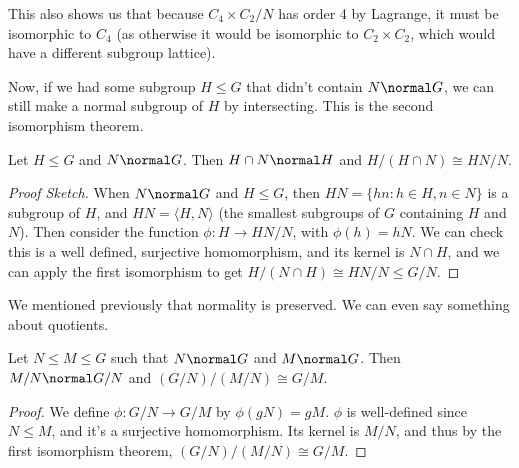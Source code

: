 \begin{example}
\begin{center}


	\end{center}
	This also shows us that because $C_4 \times C_2 / N$ has order 4 by Lagrange, it must be isomorphic to $C_4$ (as otherwise it would be isomorphic to $C_2 \times C_2$, which would have a different subgroup lattice).
\end{example}

Now, if we had some subgroup $H \leq G$ that didn't contain $N \normal G$, we can still make a normal subgroup of $H$ by intersecting. This is the second isomorphism theorem.

\begin{theorem}
	Let $H \leq G$ and $N \normal G$. Then $H \cap N \normal H$ and $H/(H \cap N) \cong HN / N$.
\end{theorem}
\begin{proof}[Proof Sketch]
	When $N \normal G$ and $H \leq G$, then $HN = \{ hn : h \in H, n \in N\}$ is a subgroup of $H$, and $HN = \langle H, N \rangle$ (the smallest subgroups of $G$ containing $H$ and $N$). Then consider the function $\phi : H \rightarrow HN/N$, with $\phi(h) = hN$. We can check this is a well defined, surjective homomorphism, and its kernel is $N \cap H$, and we can apply the first isomorphism to get $H/(N \cap H) \cong HN/N \leq G/N$.
\end{proof}

We mentioned previously that normality is preserved. We can even say something about quotients.

\begin{theorem}
	Let $N \leq M \leq G$ such that $N \normal G$ and $M \normal G$. Then $M/N \normal G/N$ and $(G/N) / (M/N) \cong G/M$.
\end{theorem}
\begin{proof}
	We define $\phi: G/N \rightarrow G/M$ by $\phi(gN) = gM$. $\phi$ is well-defined since $N \leq M$, and it's a surjective homomorphism. Its kernel is $M/N$, and thus by the first isomorphism theorem, $(G/N) / (M/N) \cong G/M$.
\end{proof}


